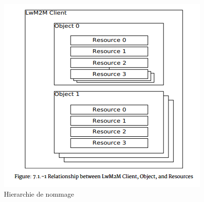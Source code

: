 \begin{figure}[tbp]
\centerline{\includegraphics[width=.6\columnwidth]{Pictures/lwm2m-objects.png}}
\caption{Hierarchie de nommage}
\label{fig-lwm2m-objects}
\end{figure}

